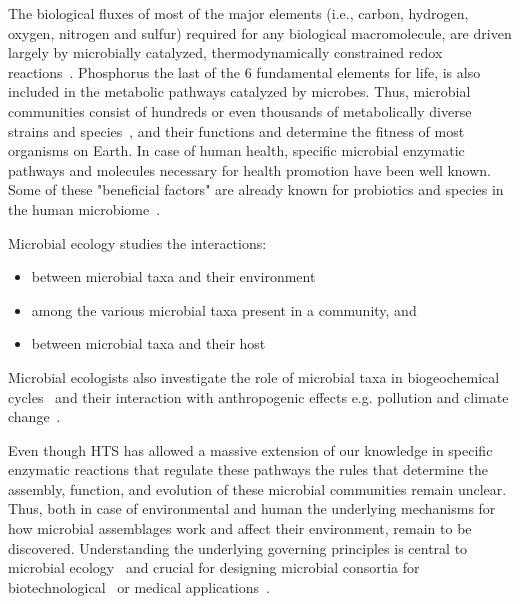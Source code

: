       The biological fluxes of most of the major elements (i.e., carbon, hydrogen, oxygen, nitrogen and sulfur) required
      for any biological macromolecule,
      are driven largely
      by microbially catalyzed, thermodynamically constrained redox reactions~\cite{falkowski2008microbial}. 
      Phosphorus the last of the 6 fundamental elements for life, is also included in the metabolic pathways catalyzed by microbes. 
      Thus, microbial communities consist of hundreds or even thousands of metabolically diverse strains and species~\cite{leventhal2018strain},
      and their functions
      and determine the fitness of most organisms on Earth. 
      In case of human health, specific microbial enzymatic pathways and molecules necessary for health promotion have been well known.
      Some of these "beneficial factors" are already known for probiotics and species in the human microbiome~\cite{marco2021defining}.


      \fi
      Microbial ecology studies the interactions: 
      \begin{itemize}
         \setlength\itemsep{0.05em}
         \item between microbial taxa and their environment
         \item among the various microbial taxa present in a community, and
         \item between microbial taxa and their host~\cite{isme}
      \end{itemize}

      Microbial ecologists also investigate the role of microbial taxa in 
      biogeochemical cycles~\cite{falkowski2008microbial} and their interaction 
      with anthropogenic effects e.g. pollution and climate change~\cite{cavicchioli2019scientists}.

      Even though HTS has allowed a massive extension of our knowledge in  
      specific enzymatic reactions that regulate these pathways the rules that determine 
      the assembly, function, and evolution of these microbial communities remain unclear. 
      Thus, both in case of environmental and human
      the underlying mechanisms for how microbial assemblages work and affect their environment, remain to be discovered.
      Understanding the underlying governing principles is central to microbial ecology~\cite{giri2021metabolic} and crucial for designing microbial consortia for biotechnological~\cite{giri2020harnessing} or medical applications~\cite{kong2018designing}.

